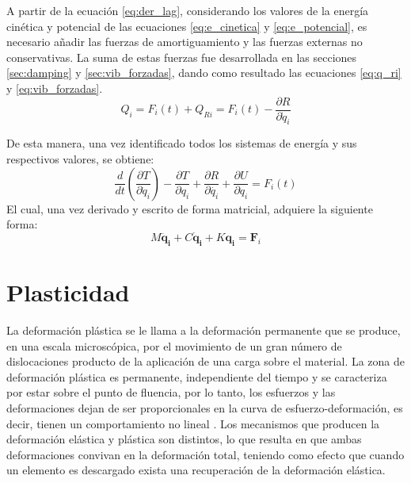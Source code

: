 A partir de la ecuación \ref{eq:der_lag}, considerando los valores de la energía cinética y potencial de las ecuaciones \ref{eq:e_cinetica} y \ref{eq:e_potencial}, es necesario añadir las fuerzas de amortiguamiento y las fuerzas externas no conservativas. La suma de estas fuerzas fue desarrollada en las secciones \ref{sec:damping} y \ref{sec:vib_forzadas}, dando como resultado las ecuaciones \ref{eq:q_ri} y \ref{eq:vib_forzadas}.
\begin{equation}\label{eq:lag_modelo}
	Q_i = F_i(t) + Q_{Ri} = F_i(t) - \frac{\partial R}{\partial \dot{q}_i} 
\end{equation}

De esta manera, una vez identificado todos los sistemas de energía y sus respectivos valores, se obtiene:
\begin{equation}
	\frac{d}{dt}\left(\frac{\partial T}{\partial \dot{q}_i}\right) - \frac{\partial T}{\partial q_i} + \frac{\partial R}{\partial \dot{q_i}} + \frac{\partial U}{\partial q_i} = F_i(t)
\end{equation}
El cual, una vez derivado y escrito de forma matricial, adquiere la siguiente forma:
\begin{equation}
	\mathit{M}\mathbf{\ddot{q}_i} + \mathit{C}\mathbf{\dot{q}_i} + \mathit{K}\mathbf{q_i} = \mathbf{F}_i
\end{equation}

\section{Plasticidad}
La deformación plástica se le llama a la deformación permanente que se produce, en una escala microscópica, por el movimiento de un gran número de dislocaciones producto de la aplicación de una carga sobre el material. La zona de deformación plástica es permanente, independiente del tiempo y se caracteriza por estar sobre el punto de fluencia, por lo tanto, los esfuerzos y las deformaciones dejan de ser proporcionales en la curva de esfuerzo-deformación, es decir, tienen un comportamiento no lineal . Los mecanismos que producen la deformación elástica y plástica son distintos, lo que resulta en que ambas deformaciones convivan en la deformación total, teniendo como efecto que cuando un elemento es descargado exista una recuperación de la deformación elástica. 



